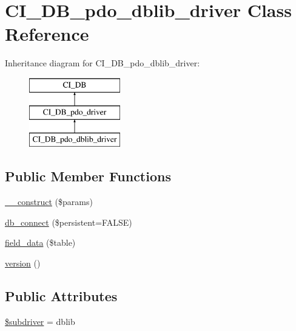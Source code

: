 \hypertarget{class_c_i___d_b__pdo__dblib__driver}{}\section{C\+I\+\_\+\+D\+B\+\_\+pdo\+\_\+dblib\+\_\+driver Class Reference}
\label{class_c_i___d_b__pdo__dblib__driver}
Inheritance diagram for C\+I\+\_\+\+D\+B\+\_\+pdo\+\_\+dblib\+\_\+driver\+:\begin{figure}[H]
\begin{center}
\leavevmode
\includegraphics[height=3.000000cm]{class_c_i___d_b__pdo__dblib__driver}
\end{center}
\end{figure}
\subsection*{Public Member Functions}
\begin{DoxyCompactItemize}
\item 
\mbox{\hyperlink{class_c_i___d_b__pdo__dblib__driver_a9162320adff1a1a4afd7f2372f753a3e}{\+\_\+\+\_\+construct}} (\$params)
\item 
\mbox{\hyperlink{class_c_i___d_b__pdo__dblib__driver_a52bf595e79e96cc0a7c907a9b45aeb4d}{db\+\_\+connect}} (\$persistent=F\+A\+L\+SE)
\item 
\mbox{\hyperlink{class_c_i___d_b__pdo__dblib__driver_a90355121e1ed009e0efdbd544ab56efa}{field\+\_\+data}} (\$table)
\item 
\mbox{\hyperlink{class_c_i___d_b__pdo__dblib__driver_a6080dae0886626b9a4cedb29240708b1}{version}} ()
\end{DoxyCompactItemize}
\subsection*{Public Attributes}
\begin{DoxyCompactItemize}
\item 
\mbox{\hyperlink{class_c_i___d_b__pdo__dblib__driver_a1322ca756348b11d080cb7a4f590de15}{\$subdriver}} = \textquotesingle{}dblib\textquotesingle{}
\end{DoxyCompactItemize}

